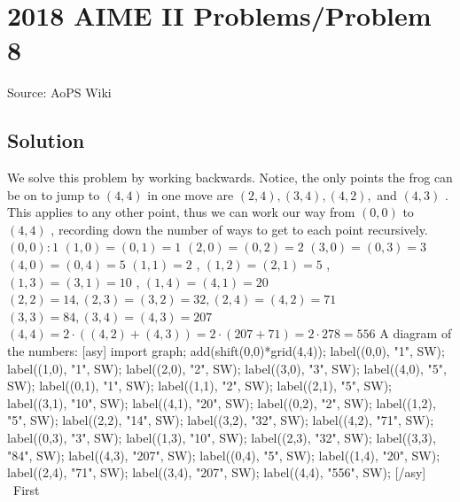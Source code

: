 \documentclass[12pt]{article}
\begin{document}
\section*{{2018 AIME II Problems/Problem 8}}
Source: AoPS Wiki

\subsection*{Solution}
We solve this problem by working backwards. Notice, the only points the frog can be on to jump to $(4,4)$ in one move are $(2,4),(3,4),(4,2),$ and $(4,3)$ . This applies to any other point, thus we can work our way from $(0,0)$ to $(4,4)$ , recording down the number of ways to get to each point recursively. $(0,0): 1$ $(1,0)=(0,1)=1$ $(2,0)=(0, 2)=2$ $(3,0)=(0, 3)=3$ $(4,0)=(0, 4)=5$ $(1,1)=2$ , $(1,2)=(2,1)=5$ , $(1,3)=(3,1)=10$ , $(1,4)=(4,1)= 20$ $(2,2)=14, (2,3)=(3,2)=32, (2,4)=(4,2)=71$ $(3,3)=84, (3,4)=(4,3)=207$ $(4,4)=2\cdot \left( (4,2)+(4,3)\right) = 2\cdot \left( 207+71\right)=2\cdot 278=\boxed{556}$ A diagram of the numbers: [asy] import graph; add(shift(0,0)*grid(4,4)); label((0,0), "1", SW); label((1,0), "1", SW); label((2,0), "2", SW); label((3,0), "3", SW); label((4,0), "5", SW); label((0,1), "1", SW); label((1,1), "2", SW); label((2,1), "5", SW); label((3,1), "10", SW); label((4,1), "20", SW); label((0,2), "2", SW); label((1,2), "5", SW); label((2,2), "14", SW); label((3,2), "32", SW); label((4,2), "71", SW); label((0,3), "3", SW); label((1,3), "10", SW); label((2,3), "32", SW); label((3,3), "84", SW); label((4,3), "207", SW); label((0,4), "5", SW); label((1,4), "20", SW); label((2,4), "71", SW); label((3,4), "207", SW); label((4,4), "556", SW); [/asy] ~First
\end{document}
